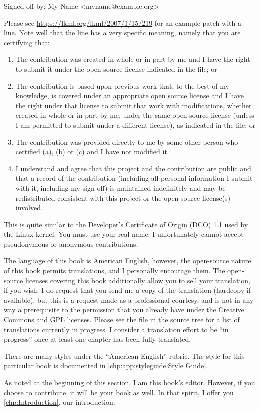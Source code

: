 \begin{VerbatimU}
Signed-off-by: My Name <myname@example.org>
\end{VerbatimU}

Please see \url{https://lkml.org/lkml/2007/1/15/219} for an example
patch with a  line.
Note well that the  line has a very specific meaning,
namely that you are certifying that:

\begin{enumerate}[label={(\alph*)}]
\item	The contribution was created in whole or in part
	by me and I have the right to submit it under
	the open source license indicated in the file; or
\item	The contribution is based upon previous work
	that, to the best of my knowledge, is covered
	under an appropriate open source license and I
	have the right under that license to submit that
	work with modifications, whether created in whole
	or in part by me, under the same open source
	license (unless I am permitted to submit under
	a different license), as indicated in the file; or
\item	The contribution was provided directly to me by
	some other person who certified (a), (b) or (c)
	and I have not modified it.
\item	I understand and agree that this project and the
	contribution are public and that a record of the
	contribution (including all personal information
	I submit with it, including my sign-off) is
	maintained indefinitely and may be redistributed
	consistent with this project or the open source
	license(s) involved.
\end{enumerate}

This is quite similar to the Developer's Certificate of Origin (DCO)
1.1 used by the Linux kernel.
You must use your real name:
I unfortunately cannot accept pseudonymous or anonymous contributions.

The language of this book is American English, however, the open-source
nature of this book permits translations, and I personally encourage them.
The open-source licenses covering this book additionally allow you
to sell your translation, if you wish.
I do request that you send me a copy of the translation (hardcopy if
available), but this is a request made as a professional courtesy,
and is not in any way a prerequisite to the permission that you already
have under the Creative Commons and GPL licenses.
Please see the  file in the source tree for a list of
translations currently in progress.
I consider a translation effort to be ``in progress'' once at least one
chapter has been fully translated.

There are many styles under the ``American English'' rubric.
The style for this particular book is documented in
\cref{chp:app:styleguide:Style Guide}.

As noted at the beginning of this section, I am this book's editor.
However, if you choose to contribute, it will be your book as well.
In that spirit, I offer you \cref{chp:Introduction}, our introduction.

